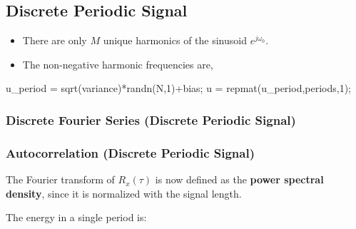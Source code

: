 \documentclass[10pt,a4paper]{scrartcl}
\begin{document}
\begin{multicols*}{2}
\subsection{Discrete Periodic Signal}



\begin{itemize}
\item There are only $M$ unique harmonics of the sinusoid $e^{j\omega_0}$.
\item The non-negative harmonic frequencies are,

\end{itemize}

\begin{TPMatlab}
u_period = sqrt(variance)*randn(N,1)+bias;
u = repmat(u_period,periods,1);
\end{TPMatlab}

\subsubsection{Discrete Fourier Series (Discrete Periodic Signal)}



\subsubsection{Autocorrelation (Discrete Periodic Signal)}


The Fourier transform of $R_x(\tau)$ is now defined as the \textbf{power spectral density}, since it is normalized with the signal length.


The energy in a single period is:



\end{multicols*}
\end{document}
